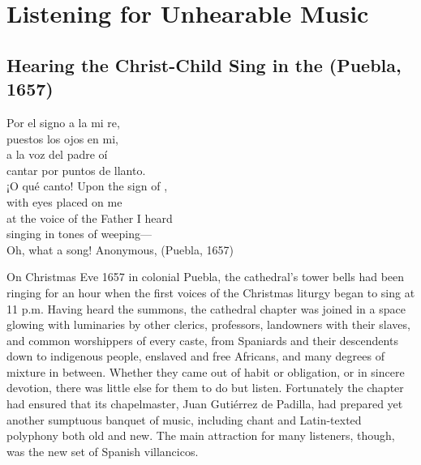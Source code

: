 
% 
% 

\part{Listening for Unhearable Music}
\label{part:unhearable-music}

\chapter{Hearing the Christ-Child Sing in the  (Puebla, 1657)}
\label{ch:padilla-voces}

\epigraphTranslation
{Por el signo a la mi re, \\ 
puestos los ojos en mi, \\
a la voz del padre oí \\
cantar por puntos de llanto. \\
¡O qué canto!}
{Upon the sign of , \\
with eyes placed on me  \\
at the voice of the Father I heard \\
singing in tones of weeping--- \\
Oh, what a song!}
{Anonymous,  (Puebla, 1657)}


On Christmas Eve 1657 in colonial Puebla, the cathedral's tower bells had been
ringing for an hour when the first voices of the Christmas liturgy began to sing
at 11 p.m.
Having heard the summons, the cathedral chapter was joined in a space glowing
with luminaries by other clerics, professors, landowners with their slaves, and
common worshippers of every caste, from Spaniards and their descendents down to
indigenous people, enslaved and free Africans, and many degrees of mixture in
between.
Whether they came out of habit or obligation, or in sincere devotion, there was
little else for them to do but listen.
Fortunately the chapter had ensured that its chapelmaster, Juan Gutiérrez de
Padilla, had prepared yet another sumptuous banquet of music, including chant
and Latin-texted polyphony both old and new.
The main attraction for many listeners, though, was the new set of Spanish
villancicos.

